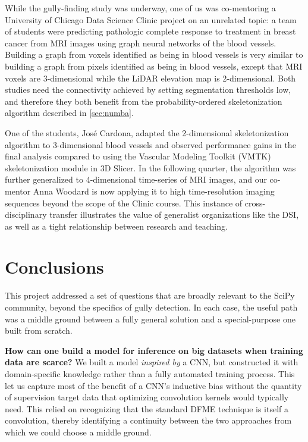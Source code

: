 While the gully-finding study was underway, one of us was co-mentoring a University of Chicago Data Science Clinic project on an unrelated topic: a team of students were predicting pathologic complete response to treatment in breast cancer from MRI images using graph neural networks of the blood vessels. Building a graph from voxels identified as being in blood vessels is very similar to building a graph from pixels identified as being in blood vessels, except that MRI voxels are 3-dimensional while the LiDAR elevation map is 2-dimensional. Both studies need the connectivity achieved by setting segmentation thresholds low, and therefore they both benefit from the probability-ordered skeletonization algorithm described in \cref{sec:numba}.

One of the students, Jos\'e Cardona, adapted the 2-dimensional skeletonization algorithm to 3-dimensional blood vessels and observed performance gains in the final analysis compared to using the Vascular Modeling Toolkit (VMTK) skeletonization module in 3D Slicer. In the following quarter, the algorithm was further generalized to 4-dimensional time-series of MRI images, and our co-mentor Anna Woodard is now applying it to high time-resolution imaging sequences beyond the scope of the Clinic course. This instance of cross-disciplinary transfer illustrates the value of generalist organizations like the DSI, as well as a tight relationship between research and teaching.

\section{Conclusions}

This project addressed a set of questions that are broadly relevant to the SciPy community, beyond the specifics of gully detection. In each case, the useful path was a middle ground between a fully general solution and a special-purpose one built from scratch.

\textbf{How can one build a model for inference on big datasets when training data are scarce?} We built a model \textit{inspired by} a CNN, but constructed it with domain-specific knowledge rather than a fully automated training process. This let us capture most of the benefit of a CNN's inductive bias without the quantity of supervision target data that optimizing convolution kernels would typically need. This relied on recognizing that the standard DFME technique is itself a convolution, thereby identifying a continuity between the two approaches from which we could choose a middle ground.

